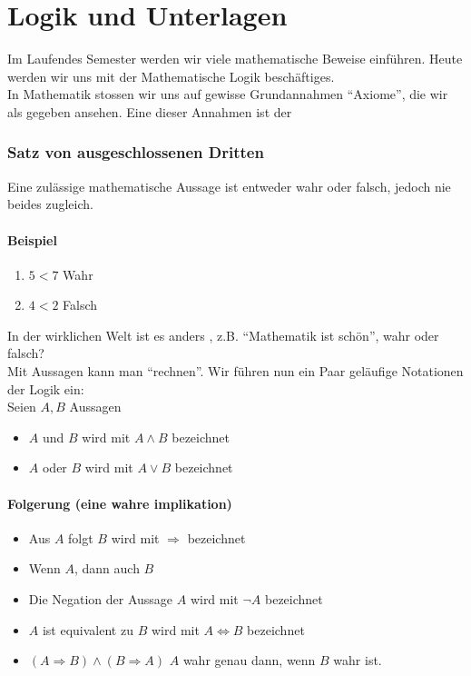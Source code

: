 \chapter{Logik und Unterlagen}
Im Laufendes Semester werden wir viele mathematische Beweise einführen. Heute werden wir uns mit der Mathematische Logik beschäftiges.\\

In Mathematik stossen wir uns auf gewisse Grundannahmen ``Axiome'', die wir als gegeben ansehen. Eine dieser Annahmen ist der 
\subsection*{Satz von ausgeschlossenen Dritten}
Eine zulässige mathematische Aussage ist entweder wahr oder falsch, jedoch nie beides zugleich.
\subsubsection*{Beispiel}
\begin{enumerate}
	\item $5<7$ Wahr
	\item $4<2$ Falsch
\end{enumerate}
In der wirklichen Welt ist es anders , z.B. ``Mathematik ist schön'', wahr oder falsch?\\

Mit Aussagen kann man ``rechnen''. Wir führen nun ein Paar geläufige Notationen der Logik ein:\\
Seien $A,B$ Aussagen
\begin{itemize}
\item $A$ und $B$ wird mit $A\land B$ bezeichnet
\item $A$ oder $B$ wird mit $A\lor B$ bezeichnet
\end{itemize}
\subsubsection*{Folgerung (eine wahre implikation)}
\begin{itemize}
\item Aus $A$ folgt $B$ wird mit $\Rightarrow$ bezeichnet
\item Wenn $A$, dann auch $B$
\item Die Negation der Aussage $A$ wird mit $\lnot A$ bezeichnet
\item $A$ ist equivalent zu $B$ wird mit $A\Leftrightarrow B$ bezeichnet
\item $\left(A\Rightarrow B\right)\land \left( B\Rightarrow A\right)$ $A$ wahr genau dann, wenn $B$ wahr ist.
\end{itemize}


